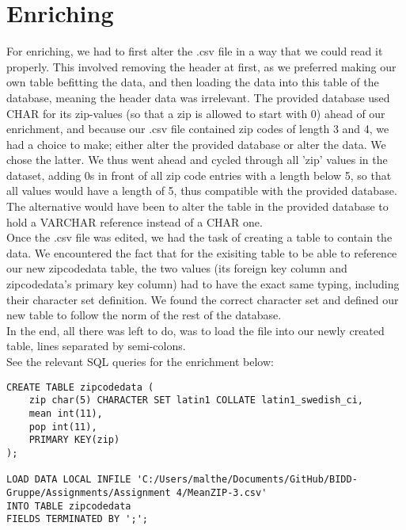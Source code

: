 \section*{Enriching}
For enriching, we had to first alter the .csv file in a way that we could read it properly. This involved removing the header at first, as we preferred making our own table befitting the data, and then loading the data into this table of the database, meaning the header data was irrelevant. The provided database used CHAR for its zip-values (so that a zip is allowed to start with 0) ahead of our enrichment, and because our .csv file contained zip codes of length 3 and 4, we had a choice to make; either alter the provided database or alter the data. We chose the latter. We thus went ahead and cycled through all 'zip' values in the dataset, adding 0s in front of all zip code entries with a length below 5, so that all values would have a length of 5, thus compatible with the provided database. The alternative would have been to alter the table in the provided database to hold a VARCHAR reference instead of a CHAR one. \\
Once the .csv file was edited, we had the task of creating a table to contain the data. We encountered the fact that for the exisiting table to be able to reference our new zipcodedata table, the two values (its foreign key column and zipcodedata's primary key column) had to have the exact same typing, including their character set definition. We found the correct character set and defined our new table to follow the norm of the rest of the database. \\
In the end, all there was left to do, was to load the file into our newly created table, lines separated by semi-colons. \\
See the relevant SQL queries for the enrichment below: \\

\begin{lstlisting}
CREATE TABLE zipcodedata (
	zip char(5) CHARACTER SET latin1 COLLATE latin1_swedish_ci,
	mean int(11),
	pop int(11),
	PRIMARY KEY(zip)
);

LOAD DATA LOCAL INFILE 'C:/Users/malthe/Documents/GitHub/BIDD-Gruppe/Assignments/Assignment 4/MeanZIP-3.csv'
INTO TABLE zipcodedata
FIELDS TERMINATED BY ';';
\end{lstlisting}